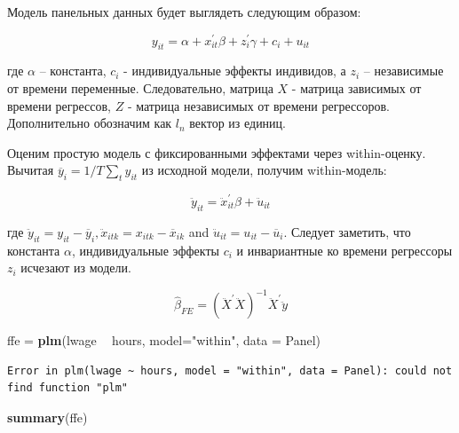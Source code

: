 \documentclass[]{book}
\newenvironment{Shaded}{\begin{snugshade}}{\end{snugshade}}
\newcommand{\DataTypeTok}[1]{\textcolor[rgb]{0.13,0.29,0.53}{#1}}
\newcommand{\KeywordTok}[1]{\textcolor[rgb]{0.13,0.29,0.53}{\textbf{#1}}}
\newcommand{\NormalTok}[1]{#1}
\newcommand{\OperatorTok}[1]{\textcolor[rgb]{0.81,0.36,0.00}{\textbf{#1}}}
\newcommand{\StringTok}[1]{\textcolor[rgb]{0.31,0.60,0.02}{#1}}
\begin{document}
Модель панельных данных будет выглядеть следующим образом:

\begin{equation}
y_{i t}=\alpha+x_{i t}^{\prime} \beta+z_{i}^{\prime} \gamma+c_{i}+u_{i t}
\end{equation}

где \(\alpha\) -- константа, \(c_{i}\) - индивидуальные эффекты индивидов, а \(z_i\) -- независимые от времени переменные. Следовательно, матрица \(X\) - матрица зависимых от времени регрессов, \(Z\) - матрица независимых от времени регрессоров. Дополнительно обозначим как \(l_n\) вектор из единиц.

Оценим простую модель с фиксированными эффектами через within-оценку. Вычитая \(\overline{y}_{i}=1 / T \sum_{t} y_{i t}\) из исходной модели, получим within-модель:

\begin{equation}
\ddot{y}_{i t}=\ddot{x}_{i t}^{\prime} \beta+\ddot{u}_{i t}
\end{equation}

где \(\ddot{y}_{i t}=y_{i t}-\overline{y}_{i}, \ddot{x}_{i t k}=x_{i t k}-\overline{x}_{i k}\) and \(\ddot{u}_{i t}=u_{i t}-\overline{u}_{i}\). Следует заметить, что константа \(\alpha\), индивидуальные эффекты \(c_i\) и инвариантные ко времени регрессоры \(z_i\) исчезают из модели.

\begin{equation}
\widehat{\beta}_{F E}=\left(\ddot{X}^{\prime} \ddot{X}\right)^{-1} \ddot{X}^{\prime} \ddot{y}
\end{equation}

\begin{Shaded}
\begin{Highlighting}[]
\NormalTok{ffe =}\StringTok{ }\KeywordTok{plm}\NormalTok{(lwage }\OperatorTok{~}\StringTok{ }\NormalTok{hours, }\DataTypeTok{model=}\StringTok{"within"}\NormalTok{, }\DataTypeTok{data =}\NormalTok{ Panel)}
\end{Highlighting}
\end{Shaded}

\begin{verbatim}
Error in plm(lwage ~ hours, model = "within", data = Panel): could not find function "plm"
\end{verbatim}

\begin{Shaded}
\begin{Highlighting}[]
\KeywordTok{summary}\NormalTok{(ffe)}
\end{Highlighting}
\end{Shaded}
\end{document}

